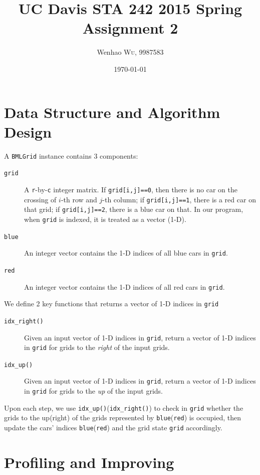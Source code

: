 \documentclass[twocolumn]{article}
\title{UC Davis STA 242 2015 Spring Assignment 2} %
\author{Wenhao \textsc{Wu}, 9987583} %
\date{\today} %
\begin{document}
\maketitle %


\section{Data Structure and Algorithm Design}
A \texttt{BMLGrid} instance contains 3 components:
\begin{description}
    \item[\texttt{grid}] A \texttt{r}-by-\texttt{c} integer matrix. If
    \texttt{grid[i,j]==0}, then there is no car on the crossing of $i$-th row
    and $j$-th column; if \texttt{grid[i,j]==1}, there is a red car on that
    grid; if \texttt{grid[i,j]==2}, there is a blue car on that. In our program,
    when \texttt{grid} is indexed, it is treated as a vector (1-D).
    \item[\texttt{blue}] An integer vector contains the 1-D indices of
    all blue cars in \texttt{grid}.
    \item[\texttt{red}] An integer vector contains the 1-D indices of
    all red cars in \texttt{grid}.
\end{description}
We define 2 key functions that returns a vector of 1-D
indices in \texttt{grid}
\begin{description}
    \item[\texttt{idx\_right()}] Given an input vector of 1-D indices in
    \texttt{grid}, return a vector of 1-D indices in \texttt{grid} for grids to
    the \emph{right} of the input grids.
    \item[\texttt{idx\_up()}] Given an input vector of 1-D indices in
    \texttt{grid}, return a vector of 1-D indices in \texttt{grid} for grids to
    the \emph{up} of the input grids.
\end{description}
Upon each step, we use \texttt{idx\_up()}(\texttt{idx\_right()}) to check in
\texttt{grid} whether the grids to the up(right) of the grids represented by
\texttt{blue}(\texttt{red}) is occupied, then update the cars' indices
\texttt{blue}(\texttt{red}) and the grid state \texttt{grid} accordingly.

\section{Profiling and Improving}
\end{document}
